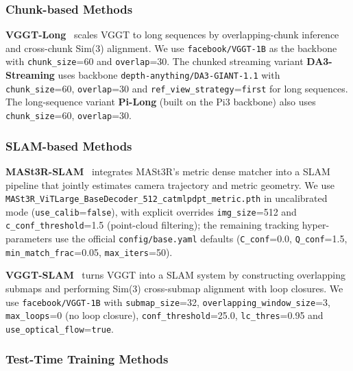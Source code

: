 \subsubsection{Chunk-based Methods}

\textbf{VGGT-Long}~\citep{deng2025vggtlong} scales VGGT to long sequences by overlapping-chunk inference and cross-chunk Sim(3) alignment.
%
We use \texttt{facebook/VGGT-1B} as the backbone with \texttt{chunk\_size}=60 and \texttt{overlap}=30.
%
The chunked streaming variant \textbf{DA3-Streaming} uses backbone \texttt{depth-anything/DA3-GIANT-1.1} with \texttt{chunk\_size}=60, \texttt{overlap}=30 and \texttt{ref\_view\_strategy}=\texttt{first} for long sequences.
%
The long-sequence variant \textbf{Pi-Long} (built on the Pi3 backbone) also uses \texttt{chunk\_size}=60, \texttt{overlap}=30.

\subsubsection{SLAM-based Methods}

\textbf{MASt3R-SLAM}~\citep{murai2024_mast3rslam} integrates MASt3R's metric dense
matcher into a SLAM pipeline that jointly estimates camera trajectory and
metric geometry.
%
We use \texttt{MASt3R\_ViTLarge\_BaseDecoder\_512\_catmlpdpt\_metric.pth} in uncalibrated mode (\texttt{use\_calib}=\texttt{false}), with explicit overrides \texttt{img\_size}=512 and \texttt{c\_conf\_threshold}=1.5 (point-cloud filtering); the remaining tracking hyper-parameters use the official \texttt{config/base.yaml} defaults (\texttt{C\_conf}=0.0, \texttt{Q\_conf}=1.5, \texttt{min\_match\_frac}=0.05, \texttt{max\_iters}=50).


\textbf{VGGT-SLAM}~\citep{maggio2025vggt-slam2} turns VGGT into a SLAM system
by constructing overlapping submaps and performing Sim(3) cross-submap
alignment with loop closures.
%
We use \texttt{facebook/VGGT-1B} with \texttt{submap\_size}=32, \texttt{overlapping\_window\_size}=3, \texttt{max\_loops}=0 (no loop closure), \texttt{conf\_threshold}=25.0, \texttt{lc\_thres}=0.95 and \texttt{use\_optical\_flow}=\texttt{true}.

\subsubsection{Test-Time Training Methods}

